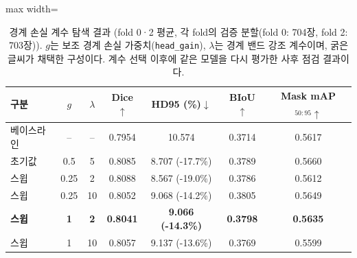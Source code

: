 \begin{table}[htbp]
\centering
\small
\caption[경계 손실 계수 탐색 결과 (fold 0·2 평균, 각 fold의 검증 분할(fold 0: 704장, fold 2: 703장)).]{경계 손실 계수 탐색 결과 (fold 0·2 평균, 각 fold의 검증 분할(fold 0: 704장, fold 2: 703장)). $g$는 보조 경계 손실 가중치(\texttt{head\_gain}), $\lambda$는 경계 밴드 강조 계수이며, 굵은 글씨가 채택한 구성이다. 계수 선택 이후에 같은 모델을 다시 평가한 사후 점검 결과이다.}
\label{tab:sweep_val}
\begin{adjustbox}{max width=\linewidth}
\begin{tabular}{lcccccc}
\toprule
구분 & $g$ & $\lambda$ & Dice$\uparrow$ & HD95 (\%)$\downarrow$ & BIoU$\uparrow$ & Mask mAP$_{50:95}\uparrow$ \\
\midrule
베이스라인 & -- & -- & 0.7954 & 10.574 & 0.3714 & 0.5617 \\
\midrule
초기값 & 0.5 & 5 & 0.8085 & 8.707 (-17.7\%) & 0.3789 & 0.5660 \\
\midrule
스윕 & 0.25 & 2 & 0.8088 & 8.567 (-19.0\%) & 0.3786 & 0.5612 \\
스윕 & 0.25 & 10 & 0.8052 & 9.068 (-14.2\%) & 0.3805 & 0.5649 \\
\textbf{스윕} & \textbf{1} & \textbf{2} & \textbf{0.8041} & \textbf{9.066 (-14.3\%)} & \textbf{0.3798} & \textbf{0.5635} \\
스윕 & 1 & 10 & 0.8057 & 9.137 (-13.6\%) & 0.3769 & 0.5599 \\
\bottomrule
\end{tabular}
\end{adjustbox}
\end{table}
